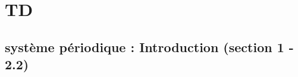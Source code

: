 \documentclass[12pt,a4paper]{article}
\begin{document}
	
	
	
	
	
	
	
	
	
	
	
	
	
	
	
	
	
	
	
	
	
	
	
	
	
	
	
	
	
	
	
	
	
	
	
	
	
	\newpage
	
	\section{TD}
	
	\subsection{système périodique : Introduction (section 1 - 2.2)}
	
\end{document}
